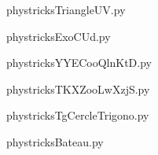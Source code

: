     \newcommand{\CaptionFigTriangleUV}{<+Type your caption here+>}
    \begin{center}
        
    \end{center}
    phystricksTriangleUV.py

    

    \clearpage
    


    \newcommand{\CaptionFigExoCUd}{<+Type your caption here+>}
    \begin{center}
        
    \end{center}
    phystricksExoCUd.py

    

    \clearpage
    


    \newcommand{\CaptionFigYYECooQlnKtD}{<+Type your caption here+>}
    \begin{center}
        
    \end{center}
    phystricksYYECooQlnKtD.py

    

    \clearpage
    


    \newcommand{\CaptionFigTKXZooLwXzjS}{<+Type your caption here+>}
    \begin{center}
        
    \end{center}
    phystricksTKXZooLwXzjS.py

    

    \clearpage
    


    \newcommand{\CaptionFigTgCercleTrigono}{<+Type your caption here+>}
    \begin{center}
        
    \end{center}
    phystricksTgCercleTrigono.py

    

    \clearpage
    


    \newcommand{\CaptionFigBateau}{<+Type your caption here+>}
    \begin{center}
        
    \end{center}
    phystricksBateau.py

